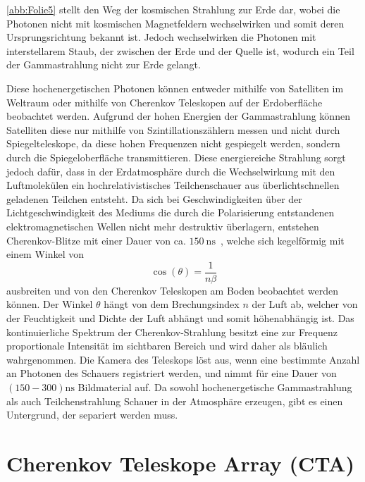 \autoref{abb:Folie5} stellt den Weg der kosmischen Strahlung zur Erde dar, wobei die Photonen nicht mit kosmischen Magnetfeldern wechselwirken
und somit deren Ursprungsrichtung bekannt ist. Jedoch wechselwirken die Photonen mit interstellarem Staub, der zwischen der Erde und der
Quelle ist, wodurch ein Teil der Gammastrahlung nicht zur Erde gelangt.

Diese hochenergetischen Photonen können entweder mithilfe von Satelliten im Weltraum oder mithilfe von Cherenkov Teleskopen auf
der Erdoberfläche beobachtet werden.
Aufgrund der hohen Energien der Gammastrahlung können Satelliten diese nur mithilfe von Szintillationszählern messen und nicht durch Spiegelteleskope,
da diese hohen Frequenzen nicht gespiegelt werden, sondern durch die Spiegeloberfläche transmittieren.
Diese energiereiche Strahlung sorgt jedoch dafür, dass in der Erdatmosphäre durch die Wechselwirkung mit den Luftmolekülen ein hochrelativistisches
Teilchenschauer aus überlichtschnellen geladenen Teilchen entsteht.
Da sich bei Geschwindigkeiten über der Lichtgeschwindigkeit des Mediums die durch die Polarisierung entstandenen elektromagnetischen Wellen
nicht mehr destruktiv überlagern, entstehen Cherenkov-Blitze mit einer Dauer von ca. $\SI{150}{\nano\s}$~\cite{Cherenkov_Licht}, welche sich kegelförmig
mit einem Winkel von
\begin{equation}
 \cos(\theta) = \frac{1}{n\beta}
\end{equation}
ausbreiten und von den Cherenkov
Teleskopen am Boden beobachtet werden können.
Der Winkel $\theta$ hängt von dem Brechungsindex $n$ der Luft ab, welcher von der Feuchtigkeit und Dichte der Luft abhängt und somit höhenabhängig ist.
Das kontinuierliche Spektrum der Cherenkov-Strahlung besitzt eine zur Frequenz proportionale Intensität im sichtbaren Bereich und
wird daher als bläulich wahrgenommen.
Die Kamera des Teleskops löst aus, wenn eine bestimmte Anzahl an Photonen des Schauers registriert werden, und nimmt
für eine Dauer von $(150-300)\si{\nano\s}$ Bildmaterial auf.
Da sowohl hochenergetische Gammastrahlung als auch Teilchenstrahlung
Schauer in der Atmosphäre erzeugen, gibt es einen Untergrund, der separiert werden muss.

\section{Cherenkov Teleskope Array (CTA)}
\label{sec:CTA}

